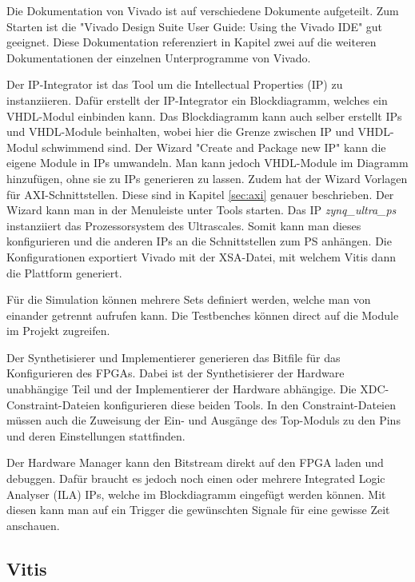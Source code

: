 Die Dokumentation von Vivado ist auf verschiedene Dokumente aufgeteilt. Zum Starten ist die "Vivado Design Suite User Guide: Using the Vivado IDE" gut geeignet. Diese Dokumentation referenziert in Kapitel zwei auf die weiteren Dokumentationen der einzelnen Unterprogramme von Vivado. 

Der IP-Integrator ist das Tool um die Intellectual Properties (IP) zu instanziieren. Dafür erstellt der IP-Integrator ein Blockdiagramm, welches ein VHDL-Modul einbinden kann. Das Blockdiagramm kann auch selber erstellt IPs und VHDL-Module beinhalten, wobei hier die Grenze zwischen IP und VHDL-Modul schwimmend sind. Der Wizard "Create and Package new IP" kann die eigene Module in IPs umwandeln. Man kann jedoch VHDL-Module im Diagramm hinzufügen, ohne sie zu IPs generieren zu lassen. Zudem hat der Wizard Vorlagen für AXI-Schnittstellen. Diese sind in Kapitel \ref{sec:axi} genauer beschrieben. Der Wizard kann man in der Menuleiste unter Tools starten. Das IP \textit{zynq\_ultra\_ps} instanziiert das Prozessorsystem des Ultrascales. Somit kann man dieses konfigurieren und die anderen IPs an die Schnittstellen zum PS anhängen. Die Konfigurationen exportiert Vivado mit der XSA-Datei, mit welchem Vitis dann die Plattform generiert. 

Für die Simulation können mehrere Sets definiert werden, welche man von einander getrennt aufrufen kann. Die Testbenches können direct auf die Module im Projekt zugreifen.  

Der Synthetisierer und Implementierer generieren das Bitfile für das Konfigurieren des FPGAs. Dabei ist der Synthetisierer der Hardware unabhängige Teil und der Implementierer der Hardware abhängige. Die XDC-Constraint-Dateien konfigurieren diese beiden Tools. In den Constraint-Dateien müssen auch die Zuweisung der Ein- und Ausgänge des Top-Moduls zu den Pins und deren Einstellungen stattfinden. 

Der Hardware Manager kann den Bitstream direkt auf den FPGA laden und debuggen. Dafür braucht es jedoch noch einen oder mehrere Integrated Logic Analyser (ILA) IPs, welche im Blockdiagramm eingefügt werden können. Mit diesen kann man auf ein Trigger die gewünschten Signale für eine gewisse Zeit anschauen. 

\subsection{Vitis}

